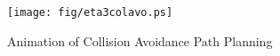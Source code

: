 \begin{figure}
\texttt{[image: fig/eta3colavo.ps]}
\caption{Animation of Collision Avoidance Path Planning}
\end{figure}

%

\newpage
